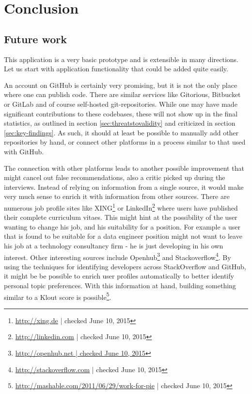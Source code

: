 \chapter{Conclusion}\label{ch:conclusion}
\section{Future work}\label{sec:future-work}
This application is a very basic prototype and is extensible in many directions.
Let us start with application functionality that could be added quite easily.

An account on GitHub is certainly very promising, but it is not the only
place where one can publish code. There are similar services like Gitorious,
Bitbucket or GitLab and of course self-hosted git-repositories.
While one may have made significant contributions to these codebases,
these will not show up in the final statistics, as outlined in
section \ref{sec:threatstovalidity} and criticized in section \ref{sec:key-findings}.
As such, it should at least be possible to manually add other repositories by
hand, or connect other platforms in a process similar to that used with GitHub.

The connection with other platforms leads to another possible improvement
that might cancel out false recommendations, also a critic picked up during the
interviews.
Instead of relying on information from a single source, it would make very
much sense to enrich it with information from other sources. There
are numerous job profile sites like XING\footnote{\url{http://xing.de} | checked June 10, 2015}
or LinkedIn\footnote{\url{http://linkedin.com} | checked June 10, 2015} where users have
published their complete curriculum vitaes. This might hint at the
possibility of the user wanting to change his job, and his suitability for
a position. For example a user that is found to be suitable for a data engineer
position might not want to leave his job at a technology consultancy
firm - he is just developing in his own interest.
Other interesting sources include Openhub\footnote{\url{http://openhub.net | checked June 10, 2015}}
and Stackoverflow\footnote{\url{http://stackoverflow.com} | checked June 10, 2015}.
By using the techniques for identifying developers across StackOverflow and
GitHub\cite{vfs:2013}, it might be be possible to enrich user profiles
automatically to better identify personal topic preferences.
With this information at hand, building something similar to a Klout score
is possible\footnote{\url{http://mashable.com/2011/06/29/work-for-pie} | checked June 10, 2015}.
\newline

